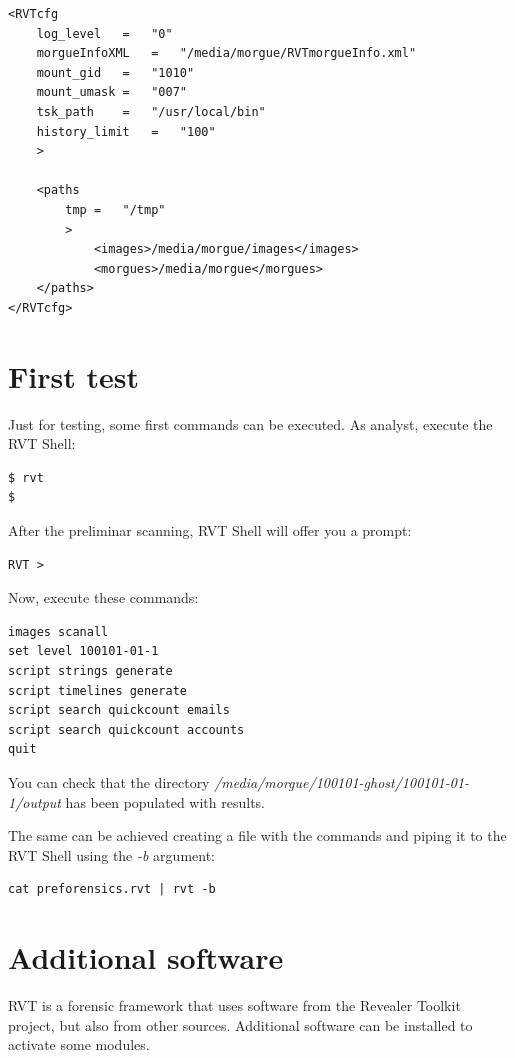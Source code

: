 \documentclass[a4paper,11pt,oneside]{report}
\begin{document}
\begin{verbatim}
<RVTcfg 
	log_level	=	"0" 
	morgueInfoXML	=	"/media/morgue/RVTmorgueInfo.xml" 
	mount_gid	=	"1010" 
	mount_umask	=	"007" 
	tsk_path	=	"/usr/local/bin"
	history_limit   =   "100"
	>
	
	<paths 
		tmp	=	"/tmp"
		>
    		<images>/media/morgue/images</images>
    		<morgues>/media/morgue</morgues>
  	</paths>
</RVTcfg>
\end{verbatim}


\section{First test}

Just for testing, some first commands can be executed. As analyst, execute the RVT Shell:

\begin{verbatim}
$ rvt
$
\end{verbatim}

After the preliminar scanning, RVT Shell will offer you a prompt:

\begin{verbatim}
RVT >
\end{verbatim}

Now, execute these commands:

\begin{verbatim}
images scanall
set level 100101-01-1
script strings generate
script timelines generate
script search quickcount emails
script search quickcount accounts
quit
\end{verbatim}

You can check that the directory \emph{/media/morgue/100101-ghost/100101-01-1/output} has been populated with results.

The same can be achieved creating a file with the commands and piping it to the RVT Shell using the \emph{-b} argument:

\begin{verbatim}
cat preforensics.rvt | rvt -b
\end{verbatim}



\section{Additional software}

RVT is a forensic framework that uses software from the Revealer Toolkit project, but also from other sources. Additional software can be installed to activate some modules.
\end{document}
